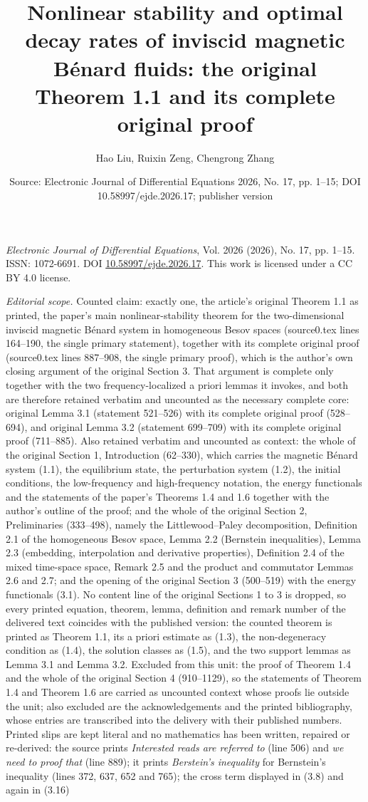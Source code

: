 \documentclass[10pt,a4paper]{amsart}
\title[Nonlinear stability of inviscid magnetic B\'enard fluids: original Theorem 1.1]{Nonlinear stability and optimal decay rates of inviscid magnetic B\'enard fluids: the original Theorem 1.1 and its complete original proof}
\author{Hao Liu, Ruixin Zeng, Chengrong Zhang}
\date{Source: Electronic Journal of Differential Equations 2026, No. 17, pp. 1--15; DOI 10.58997/ejde.2026.17; publisher version}
\numberwithin{equation}{section}
\begin{document}
\maketitle
\noindent\emph{Electronic Journal of Differential Equations}, Vol. 2026 (2026), No. 17, pp. 1--15.\newline
ISSN: 1072-6691. DOI \href{https://doi.org/10.58997/ejde.2026.17}{10.58997/ejde.2026.17}. This work is licensed under a CC BY 4.0 license.\par\smallskip
\noindent\textit{Editorial scope.} Counted claim: exactly one, the article's original Theorem 1.1 as printed, the paper's main nonlinear-stability theorem for the two-dimensional inviscid magnetic B\'enard system in homogeneous Besov spaces (source0.tex lines 164--190, the single primary statement), together with its complete original proof (source0.tex lines 887--908, the single primary proof), which is the author's own closing argument of the original Section 3. That argument is complete only together with the two frequency-localized a priori lemmas it invokes, and both are therefore retained verbatim and uncounted as the necessary complete core: original Lemma 3.1 (statement 521--526) with its complete original proof (528--694), and original Lemma 3.2 (statement 699--709) with its complete original proof (711--885). Also retained verbatim and uncounted as context: the whole of the original Section 1, Introduction (62--330), which carries the magnetic B\'enard system (1.1), the equilibrium state, the perturbation system (1.2), the initial conditions, the low-frequency and high-frequency notation, the energy functionals and the statements of the paper's Theorems 1.4 and 1.6 together with the author's outline of the proof; and the whole of the original Section 2, Preliminaries (333--498), namely the Littlewood--Paley decomposition, Definition 2.1 of the homogeneous Besov space, Lemma 2.2 (Bernstein inequalities), Lemma 2.3 (embedding, interpolation and derivative properties), Definition 2.4 of the mixed time-space space, Remark 2.5 and the product and commutator Lemmas 2.6 and 2.7; and the opening of the original Section 3 (500--519) with the energy functionals (3.1). No content line of the original Sections 1 to 3 is dropped, so every printed equation, theorem, lemma, definition and remark number of the delivered text coincides with the published version: the counted theorem is printed as Theorem 1.1, its a priori estimate as (1.3), the non-degeneracy condition as (1.4), the solution classes as (1.5), and the two support lemmas as Lemma 3.1 and Lemma 3.2. Excluded from this unit: the proof of Theorem 1.4 and the whole of the original Section 4 (910--1129), so the statements of Theorem 1.4 and Theorem 1.6 are carried as uncounted context whose proofs lie outside the unit; also excluded are the acknowledgements and the printed bibliography, whose entries are transcribed into the delivery with their published numbers. Printed slips are kept literal and no mathematics has been written, repaired or re-derived: the source prints \emph{Interested reads are referred to} (line 506) and \emph{we need to proof that} (line 889); it prints \emph{Berstein's inequality} for Bernstein's inequality (lines 372, 637, 652 and 765); the cross term displayed in (3.8) and again in (3.16) 
\end{document}
